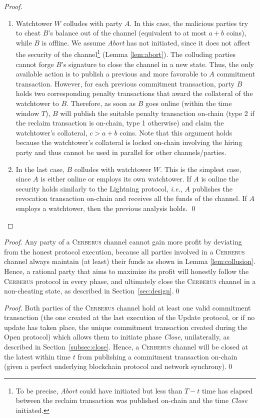 \documentclass[runningheads]{llncs}
\newcommand{\ie}{{\em i.e.}}
\newcommand{\sys}{\textsc{Cerberus}\xspace}
\begin{document}
\begin{proof}
\begin{enumerate}[label=(\roman*)]
    \item Watchtower $W$ colludes with party $A$.
    In this case, the malicious parties try to cheat $B$'s balance out of the channel (equivalent to at most $a+b$ coins), while $B$ is offline. 
    We assume \textit{Abort} has not initiated, since it does not affect the security of the channel\footnote{To be precise, \textit{Abort} could have initiated but less than $T-t$ time has elapsed between the reclaim transaction was published on-chain and the time \textit{Close} initiated.} (Lemma \ref{lem:abort}).
    The colluding parties cannot forge $B$'s signature to close the channel in a new state. Thus, the only available action is to publish a previous and more favorable to $A$ commitment transaction. 
    However, for each previous commitment transaction, party $B$ holds two corresponding penalty transactions that award the collateral of the watchtower to $B$. Therefore, as soon as $B$ goes online (within the time window $T$), $B$ will publish the suitable penalty transaction on-chain (type 2 if the reclaim transaction is on-chain, type 1 otherwise) and claim the watchtower's collateral, $c>a+b$ coins. 
    Note that this argument holds because the watchtower's collateral is locked on-chain involving the hiring party and thus cannot be used in parallel for other channels/parties.
    
    \item In the last case, $B$ colludes with watchtower $W$.
    This is the simplest case, since $A$ is either online or employs its own watchtower. If $A$ is online the security holds similarly to the Lightning protocol, \ie, $A$ publishes the revocation transaction on-chain and receives all the funds of the channel. If $A$ employs a watchtower, then the previous analysis holds. \hfill \qed
 \end{enumerate}
\end{proof}


\correctness*
\begin{proof}
Any party of a \sys channel cannot gain more profit by deviating from the honest protocol execution, because all parties involved in a \sys channel always maintain (at least) their funds as shown in Lemma \ref{lem:collusion}. Hence, a rational party that aims to maximize its profit will honestly follow the \sys protocol in every phase, and ultimately close the \sys channel in a non-cheating state, as described in Section~\ref{sec:design}.\hfill \qed
\end{proof}

\time*
\begin{proof}
Both parties of the \sys channel hold at least one valid commitment transaction (the one created at the last execution of the Update protocol, or if no update has taken place, the unique commitment transaction created during the Open protocol) which allows them to initiate phase \textit{Close}, unilaterally, as described in Section~\ref{subsec:close}. 
Hence, a \sys channel will be closed at the latest within time $t$ from publishing a commitment transaction on-chain (given a perfect underlying blockchain protocol and network synchrony).\hfill \qed
\end{proof}
\end{document}
